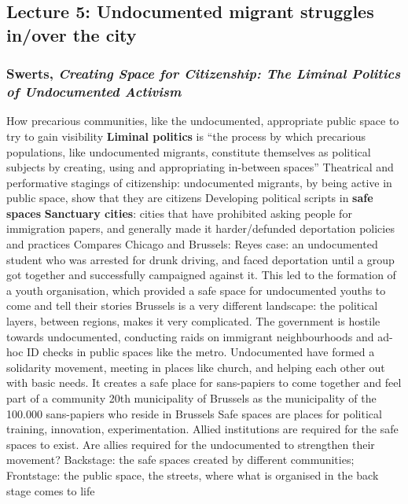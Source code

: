 \documentclass{article}
\begin{document}
\subsection{Lecture 5: Undocumented migrant struggles in/over the city}

\subsubsection{Swerts, \textit{Creating Space for Citizenship: The Liminal Politics of Undocumented Activism}}

\begin{outline}
	\1 How precarious communities, like the undocumented, appropriate public space to try to gain visibility
		\2 \textbf{Liminal politics} is ``the process by which precarious populations, like undocumented migrants, constitute themselves as political subjects by creating, using and appropriating in-between spaces''
	\1 Theatrical and performative stagings of citizenship: undocumented migrants, by being active in public space, show that they are citizens
	\1 Developing political scripts in \textbf{safe spaces}
		\2 \textbf{Sanctuary cities}: cities that have prohibited asking people for immigration papers, and generally made it harder/defunded deportation policies and practices
		\2 Compares Chicago and Brussels:
			\3 Reyes case: an undocumented student who was arrested for drunk driving, and faced deportation until a group got together and successfully campaigned against it. This led to the formation of a youth organisation, which provided a safe space for undocumented youths to come and tell their stories
			\3 Brussels is a very different landscape: the political layers, between regions, makes it very complicated. The government is hostile towards undocumented, conducting raids on immigrant neighbourhoods and ad-hoc ID checks in public spaces like the metro. Undocumented have formed a solidarity movement, meeting in places like church, and helping each other out with basic needs. It creates a safe place for sans-papiers to come together and feel part of a community
			\3 20th municipality of Brussels as the municipality of the 100.000 sans-papiers who reside in Brussels
		\2 Safe spaces are places for political training, innovation, experimentation.
	\1 Allied institutions are required for the safe spaces to exist. Are allies required for the undocumented to strengthen their movement?
	\1 Backstage: the safe spaces created by different communities; Frontstage: the public space, the streets, where what is organised in the back stage comes to life
\end{outline}
\end{document}

